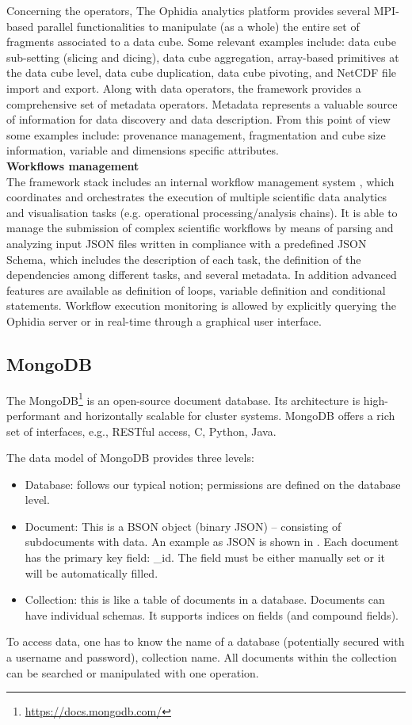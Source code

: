 Concerning the operators, The Ophidia analytics platform provides several MPI-based parallel functionalities to manipulate (as a whole) the entire set of fragments associated to a data cube. Some relevant examples include: data cube sub-setting (slicing and dicing), data cube aggregation, array-based primitives at the data cube level, data cube duplication, data cube pivoting, and NetCDF file import and export.
Along with data operators, the framework provides a comprehensive set of metadata operators. Metadata represents a valuable source of information for data discovery and data description. From this point of view some examples include: provenance management, fragmentation and cube size information, variable and dimensions specific attributes.\\

\textbf{Workflows management}\\

The framework stack includes an internal workflow management system \cite{DBLP:conf/ieeehpcs/PalazzoMFDEWA15}, which coordinates and orchestrates the execution of multiple scientific data analytics and visualisation tasks (e.g. operational processing/analysis chains). It is able to manage the submission of complex scientific workflows by means of parsing and analyzing input JSON files written in compliance with a predefined JSON Schema, which includes the description of each task, the definition of the dependencies among different tasks, and several metadata. In addition advanced features are available as definition of loops, variable definition and conditional statements. Workflow execution monitoring is allowed by explicitly querying the Ophidia server or in real-time through a graphical user interface.

\subsection{MongoDB}
The MongoDB\footnote{\url{https://docs.mongodb.com/}} is an open-source document database.
Its architecture is high-performant and horizontally scalable for cluster systems.
MongoDB offers a rich set of interfaces, e.g., RESTful access, C, Python, Java.

The data model of MongoDB provides three levels:
\begin{itemize}
  \item Database: follows our typical notion; permissions are defined on the database level.
  \item Document: This is a BSON object (binary JSON) -- consisting of subdocuments with data.
  An example as JSON is shown in .
  Each document has the primary key field: \_id. The field must be either manually set or it will be automatically filled.

  \item Collection: this is like a table of documents in a database. Documents can have individual schemas. It supports indices on fields (and compound fields).
\end{itemize}
To access data, one has to know the name of a database (potentially secured with a username and password), collection name. All documents within the collection can be searched or manipulated with one operation.

